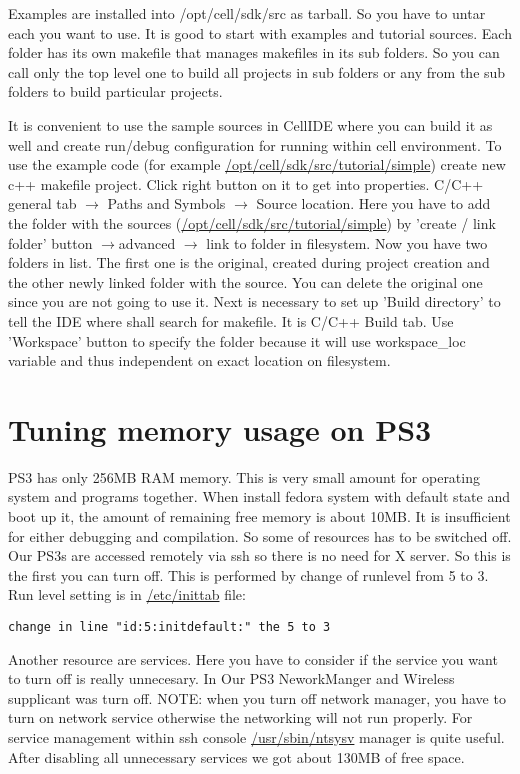 Examples are installed into /opt/cell/sdk/src as tarball. So you have to untar each you want to use.
It is good to start with examples and tutorial sources.
Each folder has its own makefile that manages makefiles in its sub folders.
 So you can call only the top level one to build all projects in sub folders or any from the sub folders to build particular projects.

It is convenient to use the sample sources in CellIDE where you can build it as well and create run/debug configuration for running within cell environment.
To use the example code (for example \url{/opt/cell/sdk/src/tutorial/simple}) create new c++ makefile project.
Click right button on it to get into properties.
C/C++ general tab $\rightarrow$ Paths and Symbols $\rightarrow$ Source location.
Here you have to add the folder with the sources (\url{/opt/cell/sdk/src/tutorial/simple}) by 'create / link folder' button $\rightarrow$advanced $\rightarrow$ link to folder in filesystem.
Now you have two folders in list. The first one is the original, created during project creation and the other newly linked folder with the source.
You can delete the original one since you are not going to use it.
Next is necessary to set up 'Build directory' to tell the IDE where shall search for makefile.
It is C/C++ Build tab. Use 'Workspace' button to specify the folder because it will use workspace\_loc variable and thus independent on exact location on filesystem.

\section{Tuning memory usage on PS3}
\label{ps3MemoryUsage}

PS3 has only 256MB RAM memory. This is very small amount for operating system and programs together.
When install fedora system with default state and boot up it, the amount of remaining free memory is about 10MB.
It is insufficient for either debugging and compilation.
So some of resources has to be switched off.
Our PS3s are accessed remotely via ssh so there is no need for X server.
So this is the first you can turn off. This is performed by change of runlevel from 5 to 3.
Run level setting is in \url{/etc/inittab} file:
\begin{verbatim}
change in line "id:5:initdefault:" the 5 to 3
\end{verbatim}
Another resource are services.
Here you have to consider if the service you want to turn off is really unnecesary.
In Our PS3 NeworkManger and Wireless supplicant was turn off.
NOTE: when you turn off network manager, you have to turn on network service otherwise the networking will not run properly.
For service management within ssh console \url{/usr/sbin/ntsysv} manager is quite useful.
After disabling all unnecessary services we got about 130MB of free space.


